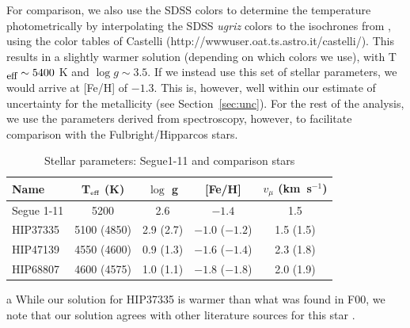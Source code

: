 \documentclass[manuscript]{aastex}
\begin{document}
For comparison, we also use the SDSS colors to determine the temperature photometrically by interpolating the SDSS {\it ugriz} colors to the isochrones from \citet{Kim2002}, using the color tables of Castelli (http://wwwuser.oat.ts.astro.it/castelli/).  This results in a slightly warmer solution (depending on which colors we use), with T$_{\mbox{\small{eff}}} \sim 5400$ K and $\log g \sim 3.5$. If we instead use this set of stellar parameters, we would arrive at [Fe/H] of $-1.3$. This is, however, well within our estimate of uncertainty for the metallicity (see Section~\ref{sec:unc}). For the rest of the analysis, we use the parameters derived from spectroscopy, however, to facilitate comparison with the Fulbright/Hipparcos stars.




\begin{table}
\begin{threeparttable}
 \begin{center}
   \caption{Stellar parameters: Segue1-11 and comparison stars}
   \label{tab:comp_para}
   \begin{tabular}{l c c c c  }
     \hline \hline
       Name       &  T$_{\mbox{\tiny{eff}}}$ (K) & $\log$ g  & [Fe/H]            & $v_{\mu}$ (km~s$^{-1}$)   \\ \hline  
       Segue 1-11 &  5200          &  2.6      & $-1.4$            & 1.5                \\
       HIP37335\tnote{a}   &  5100 (4850)   &  2.9 (2.7)& $-1.0$ ($-1.2$)   & 1.5 (1.5)           \\
       HIP47139   &  4550 (4600)   &  0.9 (1.3)& $-1.6$ ($-1.4$)   & 2.3 (1.8)          \\
       HIP68807   &  4600 (4575)   &  1.0 (1.1)& $-1.8$ ($-1.8$)   & 2.0 (1.9)          \\ \hline
  \end{tabular}
  \begin{tablenotes}
  \item[a]{While our solution for HIP37335 is warmer than what was found in F00, we note that our solution agrees with other literature sources for this star \citep[e.g.,][]{Soubiran2008, Cenarro2007, Peterson1981}.}
  \end{tablenotes}
 \end{center}
 \end{threeparttable}
\end{table}
\end{document}

